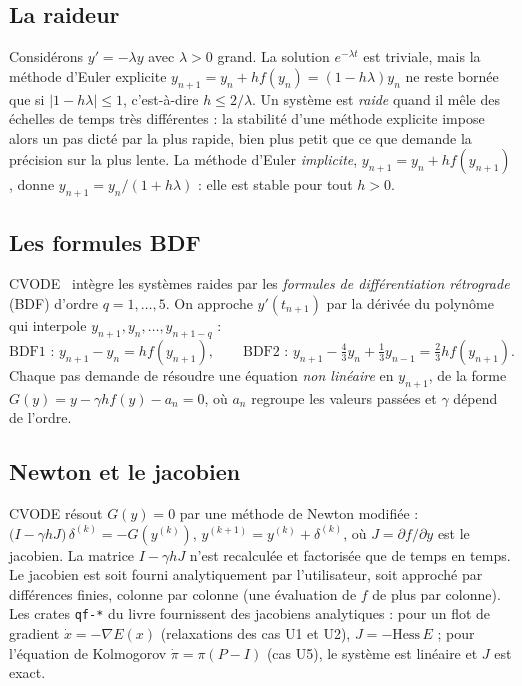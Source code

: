 \subsection{La raideur}
Considérons $y'=-\lambda y$ avec $\lambda>0$ grand. La solution $e^{-\lambda t}$ est triviale, mais la méthode d'Euler
explicite $y_{n+1}=y_n+hf(y_n)=(1-h\lambda)y_n$ ne reste bornée que si $|1-h\lambda|\le1$, c'est-à-dire $h\le2/\lambda$.
Un système est \emph{raide} quand il mêle des échelles de temps très différentes : la stabilité d'une méthode
explicite impose alors un pas dicté par la plus rapide, bien plus petit que ce que demande la précision sur la plus
lente. La méthode d'Euler \emph{implicite}, $y_{n+1}=y_n+hf(y_{n+1})$, donne $y_{n+1}=y_n/(1+h\lambda)$ : elle est stable
pour tout $h>0$.

\subsection{Les formules BDF}
CVODE~\cite{app:sundials} intègre les systèmes raides par les \emph{formules de différentiation rétrograde} (BDF)
d'ordre $q=1,\dots,5$. On approche $y'(t_{n+1})$ par la dérivée du polynôme qui interpole $y_{n+1},y_n,\dots,y_{n+1-q}$ :
\[\text{BDF1 : }y_{n+1}-y_n=hf(y_{n+1}),\qquad\text{BDF2 : }y_{n+1}-\tfrac43y_n+\tfrac13y_{n-1}=\tfrac23hf(y_{n+1}).\]
Chaque pas demande de résoudre une équation \emph{non linéaire} en $y_{n+1}$, de la forme $G(y)=y-\gamma hf(y)-a_n=0$, où
$a_n$ regroupe les valeurs passées et $\gamma$ dépend de l'ordre.

\subsection{Newton et le jacobien}
CVODE résout $G(y)=0$ par une méthode de Newton modifiée :
$\bigl(I-\gamma hJ\bigr)\,\delta^{(k)}=-G(y^{(k)})$, $y^{(k+1)}=y^{(k)}+\delta^{(k)}$, où $J=\partial f/\partial y$ est le
jacobien. La matrice $I-\gamma hJ$ n'est recalculée et factorisée que de temps en temps. Le jacobien est soit fourni
analytiquement par l'utilisateur, soit approché par différences finies, colonne par colonne (une évaluation de $f$ de
plus par colonne). Les crates \texttt{qf-*} du livre fournissent des jacobiens analytiques : pour un flot de gradient
$\dot x=-\nabla E(x)$ (relaxations des cas U1 et U2), $J=-\mathrm{Hess}\,E$ ; pour l'équation de Kolmogorov
$\dot\pi=\pi(P-I)$ (cas U5), le système est linéaire et $J$ est exact.

